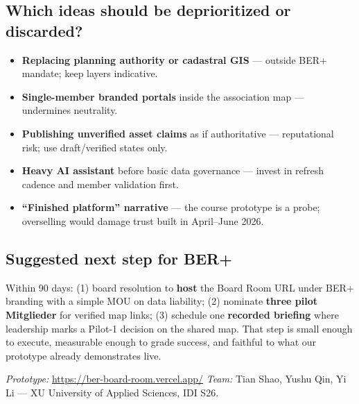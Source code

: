 \documentclass[11pt,a4paper]{article}
\begin{document}
\subsection*{Which ideas should be deprioritized or discarded?}
\begin{itemize}
  \item \textbf{Replacing planning authority or cadastral GIS} — outside BER+ mandate; keep layers indicative.
  \item \textbf{Single-member branded portals} inside the association map — undermines neutrality.
  \item \textbf{Publishing unverified asset claims} as if authoritative — reputational risk; use draft/verified states only.
  \item \textbf{Heavy AI assistant} before basic data governance — invest in refresh cadence and member validation first.
  \item \textbf{``Finished platform'' narrative} — the course prototype is a probe; overselling would damage trust built in April--June 2026.
\end{itemize}

\subsection*{Suggested next step for BER+}
Within 90 days: (1) board resolution to \textbf{host} the Board Room URL under BER+ branding with a simple MOU on data liability; (2) nominate \textbf{three pilot Mitglieder} for verified map links; (3) schedule one \textbf{recorded briefing} where leadership marks a Pilot-1 decision on the shared map. That step is small enough to execute, measurable enough to grade success, and faithful to what our prototype already demonstrates live.

\vspace{1em}
\noindent\textit{Prototype:} \url{https://ber-board-room.vercel.app/} \quad
\textit{Team:} Tian Shao, Yushu Qin, Yi Li — XU University of Applied Sciences, IDI S26.
\end{document}
